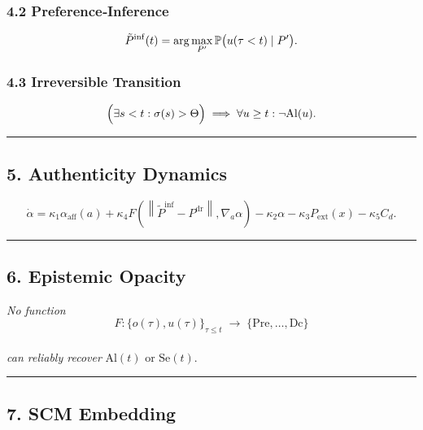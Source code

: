 \documentclass[
]{article}
\begin{document}
\hypertarget{preferenceinference}{%
\subsubsection{4.2 Preference‐Inference}\label{preferenceinference}}

\[
\tilde P^{\rm inf}(t)
= \arg\max_{P'} \mathbb P\bigl(u(\tau<t)\mid P'\bigr).
\]

\hypertarget{irreversible-transition}{%
\subsubsection{4.3 Irreversible
Transition}\label{irreversible-transition}}

\[
\Bigl(\exists s<t:\sigma(s)>\Theta\Bigr)
\;\Longrightarrow\;
\forall u\ge t:\neg \mathrm{Al}(u).
\]

\begin{center}\rule{0.5\linewidth}{0.5pt}\end{center}

\hypertarget{authenticity-dynamics}{%
\subsection{5. Authenticity Dynamics}\label{authenticity-dynamics}}

\[
\dot{\alpha} = \kappa_1 \alpha_{\mathrm{aff}}(a) + \kappa_4 F\left(\left\|\tilde{P}^{\mathrm{inf}} - P^{\mathrm{dr}}\right\|, \nabla_a \alpha \right) - \kappa_2 \alpha - \kappa_3 P_{\mathrm{ext}}(x) - \kappa_5 C_d.
\]

\begin{center}\rule{0.5\linewidth}{0.5pt}\end{center}

\hypertarget{epistemic-opacity}{%
\subsection{6. Epistemic Opacity}\label{epistemic-opacity}}

\emph{No function}\\
\[
F:\{o(\tau),u(\tau)\}_{\tau\le t}\;\to\;\{\mathrm{Pre},\dots,\mathrm{Dc}\}
\]\\
\emph{can reliably recover} \(\mathrm{Al}(t)\) or \(\mathrm{Se}(t)\).

\begin{center}\rule{0.5\linewidth}{0.5pt}\end{center}

\hypertarget{scm-embedding}{%
\subsection{7. SCM Embedding}\label{scm-embedding}}
\end{document}
